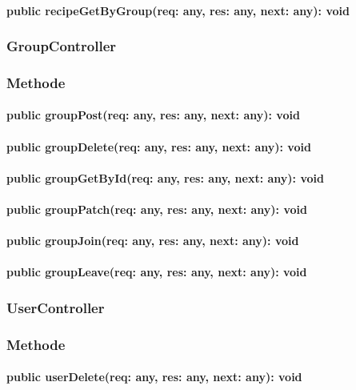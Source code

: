 \documentclass[parskip=full]{scrartcl}
\begin{document}
\paragraph{public recipeGetByGroup(req: any, res: any, next: any): void}

\subsubsection{GroupController}
\subsubsection*{Methode}
\paragraph{public groupPost(req: any, res: any, next: any): void}
\paragraph{public groupDelete(req: any, res: any, next: any): void}
\paragraph{public groupGetById(req: any, res: any, next: any): void}
\paragraph{public groupPatch(req: any, res: any, next: any): void}
\paragraph{public groupJoin(req: any, res: any, next: any): void}
\paragraph{public groupLeave(req: any, res: any, next: any): void}

\subsubsection{UserController}
\subsubsection*{Methode}
\paragraph{public userDelete(req: any, res: any, next: any): void}
\end{document}
